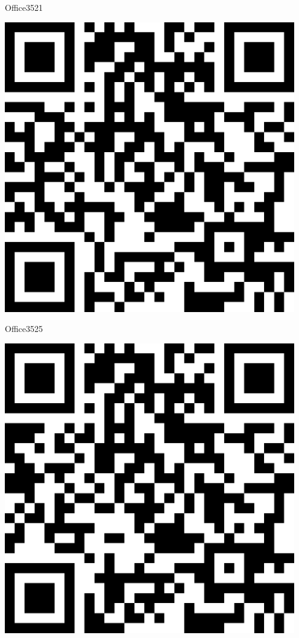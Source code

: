 \documentclass[letterpaper]{article}
\begin{document}
 \hfill{\small Office3521} 

 \vspace{1in} 
 \pagebreak 
{} 
 \vspace*{\fill} 
 \begingroup 
 \centerline{\includegraphics[scale=1,width=5in,height=5in]{Office3525.png}} 
 \endgroup 
 \vspace*{\fill} 

 \hfill{\small Office3525} 

 \vspace{1in} 
 \pagebreak 
{} 
 \vspace*{\fill} 
 \begingroup 
 \centerline{\includegraphics[scale=1,width=5in,height=5in]{Office3527.png}} 
 \endgroup 
 \vspace*{\fill} 
\end{document}

